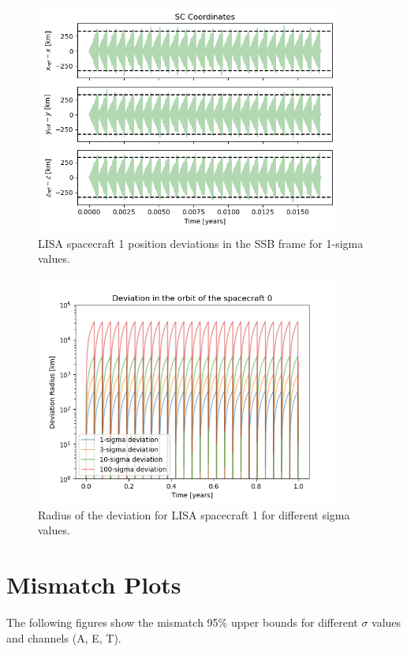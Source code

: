 \documentclass[a4paper,12pt]{article}
\begin{document}
\begin{figure}
    \centering
    \includegraphics[width=0.9\textwidth]{orbits_deviation.png}
    \caption{LISA spacecraft 1 position deviations in the SSB frame for 1-sigma values.}
    \label{fig:sc_deviation}
\end{figure}

\begin{figure}
    \centering
    \includegraphics[width=0.9\textwidth]{radius_deviation.png}
    \caption{Radius of the deviation for LISA spacecraft 1 for different sigma values.}
    \label{fig:sc_radius_deviation}
\end{figure}


\section{Mismatch Plots}
The following figures show the mismatch 95\% upper bounds for different $\sigma$ values and channels (A, E, T).
\end{document}
